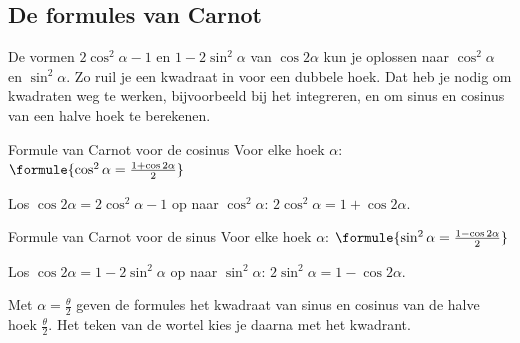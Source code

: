 \begin{oefeningen}
\end{oefeningen}

\subsection{De formules van Carnot}

De vormen $2\cos^2\alpha - 1$ en $1 - 2\sin^2\alpha$ van $\cos 2\alpha$ kun je oplossen naar $\cos^2\alpha$ en $\sin^2\alpha$. Zo ruil je een kwadraat in voor een dubbele hoek. Dat heb je nodig om kwadraten weg te werken, bijvoorbeeld bij het integreren, en om sinus en cosinus van een halve hoek te berekenen.

\begin{theorie}
\begin{stelling}{Formule van Carnot voor de cosinus}
Voor elke hoek $\alpha$: \quad $\formule{\cos^2\alpha = \frac{1 + \cos 2\alpha}{2}}$
\end{stelling}
\begin{bewijs}
Los $\cos 2\alpha = 2\cos^2\alpha - 1$ op naar $\cos^2\alpha$: \quad $2\cos^2\alpha = 1 + \cos 2\alpha$.
\end{bewijs}
\begin{stelling}{Formule van Carnot voor de sinus}
Voor elke hoek $\alpha$: \quad $\formule{\sin^2\alpha = \frac{1 - \cos 2\alpha}{2}}$
\end{stelling}
\begin{bewijs}
Los $\cos 2\alpha = 1 - 2\sin^2\alpha$ op naar $\sin^2\alpha$: \quad $2\sin^2\alpha = 1 - \cos 2\alpha$.
\end{bewijs}
\end{theorie}

Met $\alpha = \frac{\theta}{2}$ geven de formules het kwadraat van sinus en cosinus van de halve hoek $\frac{\theta}{2}$. Het teken van de wortel kies je daarna met het kwadrant.


